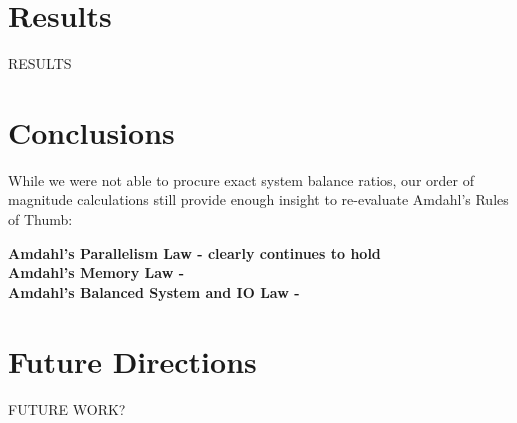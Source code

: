 \documentclass[a0,portrait]{a0poster}
\begin{document}
\begin{multicols}{2}

\section*{Results}



RESULTS


\color{SaddleBrown} %

\section*{Conclusions}

While we were not able to procure exact system balance ratios, our order of magnitude calculations still provide enough insight to re-evaluate Amdahl's Rules of Thumb:

\noindent \bf{Amdahl's Parallelism Law} - clearly continues to hold \\
\bf{Amdahl's Memory Law} - \\
\bf{Amdahl's Balanced System and IO Law} - \\



\color{DarkSlateGray} %


\section*{Future Directions}

FUTURE WORK?



\end{multicols}
\end{document}
